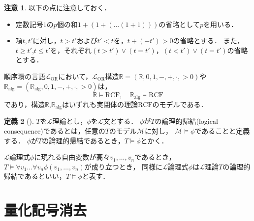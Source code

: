 \documentclass[uplatex, dvipdfmx]{jsarticle}
\numberwithin{equation}{section}
\newcommand{\R}{\mathbb{R}}
\newcommand{\Ralg}{\mathbb{R}_\mathrm{alg}}
\newcommand{\RCF}{\mathrm{RCF}}
\theoremstyle{definition}
\newtheorem{definition}{定義}[section]
\newtheorem{remark}[definition]{注意}
\begin{document}
\begin{remark}以下の点に注意しておく．
     \begin{itemize}
          \item 
          定数記号$1$の$p$個の和$1+(1 + (\dots (1 + 1)))$の省略として$p$を用いる．
          \item 
          項$t, t'$に対し，$t>t'$および$t'<t$を，$t + (- t')>0$の省略とする．
          また，$t\geq t'$,$t \leq t'$を，それぞれ$(t>t') \lor (t=t')$，$(t<t') \lor (t=t')$の省略とする．
     \end{itemize}
\end{remark}


順序環の言語$\mathcal{L}_{\mathrm{OR}}$において，$\mathcal{L}_\mathrm{OR}$構造$\R=(\R,0,1,-,+,\cdot,>0)$や$\Ralg=(\Ralg,0,1,-,+,\cdot,>0)$は，
\begin{equation}
     \R \models \RCF, \quad \Ralg \models \RCF
\end{equation}
であり，構造$\R$,$\Ralg$はいずれも実閉体の理論$\RCF$のモデルである．

\begin{definition}[{\cite[Definition 1.2.12]{MR1924282}}]
     $T$を$\mathcal{L}$理論とし，$\phi$を$\mathcal{L}$文とする．
     $\phi$が$T$の論理的帰結(logical consequence)であるとは，任意の$T$のモデル$\mathcal{M}$に対し，
     $\mathcal{M} \models \phi$であることと定義する．
     $\phi$が$T$の論理的帰結であるとき，$T \models \phi$とかく．
\end{definition}

$\mathcal{L}$論理式$\phi$に現れる自由変数が高々$v_1, \dots, v_n$であるとき，
$T \models \forall v_1 \dots \forall v_n \phi(v_1, \dots, v_n)$が成り立つとき，
同様に$\mathcal{L}$論理式$\phi$は$\mathcal{L}$理論$T$の論理的帰結であるといい，$T \models \phi$と表す．


\section{量化記号消去}
\end{document}
